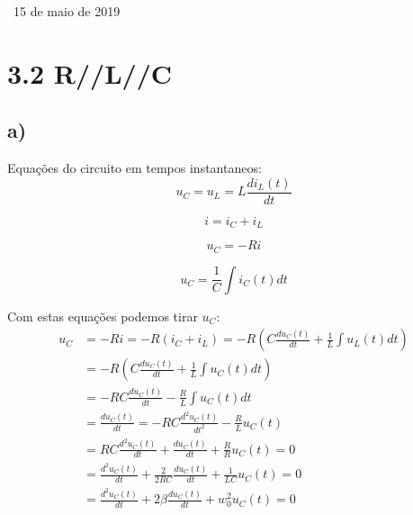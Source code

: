 \begin{titlepage}
\vspace{-1cm}
{\large \ 15 de maio de 2019} %




\vfill %
\end{titlepage}
\newpage

\section*{3.2 R//L//C}

\subsection*{a)}

Equações do circuito em tempos instantaneos:
\begin{equation}
    u_C = u_L = L \frac{d i_L(t)}{dt}
\end{equation}

\begin{equation}
    i = i_C + i_L
\end{equation}

\begin{equation}
    u_C = -Ri
\end{equation}

\begin{equation}
    u_C = \frac{1}{C}  \int i_C(t) dt
\end{equation}

Com estas equações podemos tirar $u_C$:
\begin{equation}
    \begin{aligned}
        u_C &= -Ri = -R(i_C+i_L) = -R(C\frac{du_C(t)}{dt} + \frac{1}{L} \int u_L(t)dt) \\
        & = -R(C\frac{du_C(t)}{dt} + \frac{1}{L} \int u_C(t)dt)\\
        &  = -RC \frac{du_C(t)}{dt} - \frac{R}{L}\int u_C(t)dt \\
        &  = \frac{du_C(t)}{dt} = -RC \frac{d^2 u_C(t)}{dt^2} - \frac{R}{L} u_C(t)\\
        &  = RC \frac{d^2 u_C(t)}{dt} + \frac{du_C(t)}{dt} + \frac{R}{R} u_C(t) = 0\\
        & = \frac{d^2u_C(t)}{dt} + \frac{2}{2RC} \frac{du_C(t)}{dt} + \frac{1}{LC} u_C(t) = 0\\
        & = \frac{d^2u_C(t)}{dt} + 2 \beta \frac{du_C(t)}{dt} + w_0^2 u_C(t) = 0
    \end{aligned}
\end{equation}

